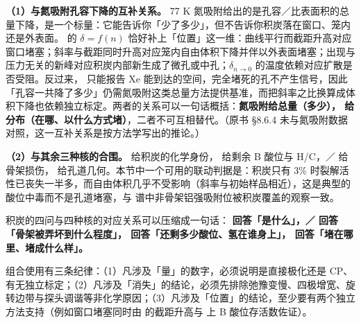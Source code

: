 \begin{crosscheck}
\textbf{（1）与氮吸附孔容下降的互补关系。} 77 K 氮吸附给出的是孔容／比表面积的总量下降，是一个标量：它能告诉你「少了多少」，但不告诉你积炭落在窗口、笼内还是外表面。 的 $\delta=f(n)$ 恰好补上「位置」这一维：曲线平行而截距升高对应窗口堵塞；斜率与截距同时升高对应笼内自由体积下降并伴以外表面堵塞；出现与压力无关的新峰对应积炭内部新生成了微孔或中孔；$\delta_{n\to 0}$ 的温度依赖对应扩散是否受阻。反过来， 只能报告 Xe 能到达的空间，完全堵死的孔不产生信号，因此「孔容一共降了多少」仍需氮吸附这类总量方法提供基准，而把斜率之比换算成体积下降也依赖独立标定。两者的关系可以一句话概括：\textbf{氮吸附给总量（多少）， 给分布（在哪、以什么方式堵）}，二者不可互相替代。（原书 §8.6.4 未与氮吸附数据对照，这一互补关系是按方法学写出的推论。）

\textbf{（2）与其余三种核的合围。}  给积炭的化学身份， 给剩余 B 酸位与 H/C，／ 给骨架损伤， 给孔道几何。本节中一个可用的联动判据是：积炭只有 3\% 时裂解活性已丧失一半多，而自由体积几乎不受影响（斜率与初始样品相近），这是典型的酸位中毒而不是孔道堵塞，与  谱中非骨架铝强吸附位被积炭覆盖的观察一致。
\end{crosscheck}

\begin{methodsum}
积炭的四问与四种核的对应关系可以压缩成一句话：\textbf{ 回答「是什么」，／ 回答「骨架被弄坏到什么程度」， 回答「还剩多少酸位、氢在谁身上」， 回答「堵在哪里、堵成什么样」。}

组合使用有三条纪律：（1）凡涉及「量」的数字，必须说明是直接极化还是 CP、有无独立标定；（2）凡涉及「消失」的结论，必须先排除弛豫变慢、四极增宽、旋转边带与探头调谐等非化学原因；（3）凡涉及「位置」的结论，至少要有两个独立方法支持（例如窗口堵塞同时由  的截距升高与  上 B 酸位存活数佐证）。
\end{methodsum}

